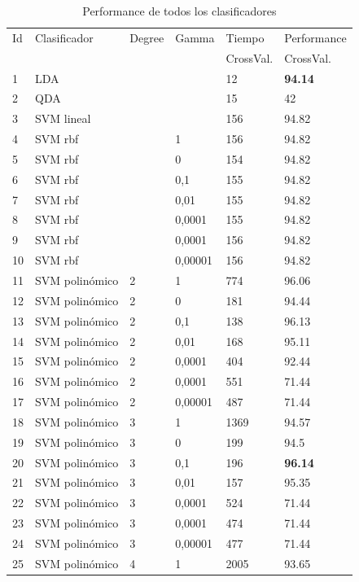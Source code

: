\documentclass[journal]{IEEEtran}
\begin{document}
\begin{table}[!h]
\caption{Performance de todos los clasificadores}
\label{table:main_results}
\centering
\begin{tabular}{l | l l l | l l}
Id	&	Clasificador	&	Degree	&	Gamma	&	Tiempo	&	Performance \\
	&			&		&		&	CrossVal.	&	CrossVal. \\
\hline
	1	&	LDA	&		&		&	12	&	\textbf{94.14} \\
\hline
	2	&	QDA	&		&		&	15	&	42 \\
\hline
	3	&	SVM lineal 	&		&		&	156	&	94.82 \\
	4	&	SVM rbf  	&		&	1	&	156	&	94.82 \\
	5	&	SVM rbf  	&		&	0	&	154	&	94.82 \\
	6	&	SVM rbf  	&		&	 0,1 	&	155	&	94.82 \\
	7	&	SVM rbf  	&		&	 0,01 	&	155	&	94.82 \\
	8	&	SVM rbf  	&		&	0,0001	&	155	&	94.82 \\
	9	&	SVM rbf  	&		&	 0,0001 	&	156	&	94.82 \\
	10	&	SVM rbf  	&		&	 0,00001 	&	156	&	94.82 \\
	11	&	SVM polinómico 	&	2	&	1	&	774	&	96.06 \\
	12	&	SVM polinómico 	&	2	&	0	&	181	&	94.44 \\
	13	&	SVM polinómico 	&	2	&	 0,1  	&	138	&	96.13 \\
	14	&	SVM polinómico 	&	2	&	 0,01  	&	168	&	95.11 \\
	15	&	SVM polinómico 	&	2	&	0,0001	&	404	&	92.44 \\
	16	&	SVM polinómico 	&	2	&	 0,0001  	&	551	&	71.44 \\
	17	&	SVM polinómico 	&	2	&	 0,00001  	&	487	&	71.44 \\
	18	&	SVM polinómico 	&	3	&	1	&	1369	&	94.57 \\
	19	&	SVM polinómico 	&	3	&	0	&	199	&	94.5 \\
	20	&	SVM polinómico 	&	3	&	 0,1  	&	196	&	\textbf{96.14} \\
	21	&	SVM polinómico 	&	3	&	 0,01  	&	157	&	95.35 \\
	22	&	SVM polinómico 	&	3	&	0,0001	&	524	&	71.44 \\
	23	&	SVM polinómico 	&	3	&	 0,0001  	&	474	&	71.44 \\
	24	&	SVM polinómico 	&	3	&	 0,00001  	&	477	&	71.44 \\
	25	&	SVM polinómico 	&	4	&	1	&	2005	&	93.65 \\

\end{tabular}
\end{table}
\end{document}
